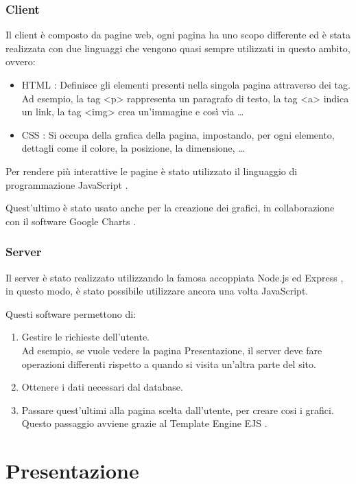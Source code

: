 \subsubsection{Client}

Il client è composto da pagine web, ogni pagina ha uno scopo differente ed è stata realizzata con due linguaggi che vengono quasi sempre utilizzati in questo ambito, ovvero:
\begin{itemize}
\item HTML \cite{HTML}: Definisce gli elementi presenti nella singola pagina attraverso dei tag. \\ Ad esempio, la tag <p> rappresenta un paragrafo di testo, la tag <a> indica un link, la tag <img> crea un'immagine e così via \dots
\item CSS \cite{CSS}: Si occupa della grafica della pagina, impostando, per ogni elemento, dettagli come il colore, la posizione, la dimensione, \dots
\end{itemize}

Per rendere più interattive le pagine è stato utilizzato il linguaggio di programmazione JavaScript \cite{JS}.

Quest'ultimo è stato usato anche per la creazione dei grafici, in collaborazione con il software Google Charts \cite{GC}.

\subsubsection{Server}

Il server è stato realizzato utilizzando la famosa accoppiata Node.js \cite{Node} ed Express \cite{Express}, in questo modo, è stato possibile utilizzare ancora una volta JavaScript.

Questi software permettono di:
\begin{enumerate}
\item Gestire le richieste dell'utente. \\ Ad esempio, se vuole vedere la pagina Presentazione, il server deve fare operazioni differenti rispetto a quando si visita un'altra parte del sito.
\item Ottenere i dati necessari dal database.
\item Passare quest'ultimi alla pagina scelta dall'utente, per creare cosi i grafici. \\ Questo passaggio avviene grazie al Template Engine EJS \cite{EJS}.
\end{enumerate}

\section{Presentazione}

